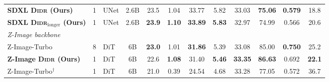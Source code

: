 \begin{table}[!t]
{\begin{tabular}{lclccccccccc}
\textbf{SDXL \textsc{Didr} (Ours)}                  & 1 & UNet & 2.6B & 23.5 & 1.04 & 33.77 & 5.82 & 33.03 & \textbf{75.06} & \textbf{0.579} & 18.8 \\
\textbf{SDXL \textsc{Didr}$_{\text{longer}}$ (Ours)} & 1 & UNet & 2.6B & \textbf{23.9} & \textbf{1.10} & \textbf{33.89} & \textbf{5.83} & 32.97 & 74.99 & 0.566 & 20.6 \\
\midrule
\multicolumn{12}{l}{\textit{Z-Image backbone}} \\
Z-Image-Turbo~\citep{zimage}                        & 8 & DiT & 6B & \textbf{23.0} & 1.01 & \textbf{31.86} & 5.39 & 33.08 & 85.00 & \textbf{0.750} & 25.2 \\
\textbf{Z-Image \textsc{Didr} (Ours)}               & 1 & DiT & 6B & 22.6 & \textbf{1.08} & 31.40 & \textbf{5.46} & \textbf{33.35} & \textbf{86.63} & 0.692 & \textbf{22.1} \\
\hdashline
Z-Image-Turbo$^\dagger$~\citep{zimage}              & 1 & DiT & 6B & 21.0 & 0.39 & 24.54 & 4.68 & 33.28 & 77.05 & 0.572 & 36.7 \\
\bottomrule
\end{tabular}}
\vspace{-0.15in}
\end{table}
